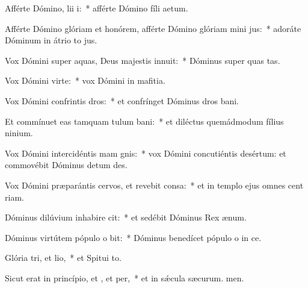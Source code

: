 \item Afférte Dómino, lii i:~* afférte Dómino fíli aetum.
\item Afférte Dómino glóriam et honórem, afférte Dómino glóriam mini jus:~* adoráte Dóminum in átrio to jus.
\item Vox Dómini super aquas, Deus majestis innuit:~* Dóminus super quas tas.
\item Vox Dómini  virte:~* vox Dómini in mafitia.
\item Vox Dómini confrintis dros:~* et confrínget Dóminus dros bani.
\item Et commínuet eas tamquam tulum bani:~* et diléctus quemádmodum fílius ninium.
\item Vox Dómini intercidéntis mam gnis:~* vox Dómini concutiéntis desértum: et commovébit Dóminus detum des.
\item Vox Dómini præparántis cervos, et revebit consa:~* et in templo ejus omnes cent riam.
\item Dóminus dilúvium inhabire cit:~* et sedébit Dóminus Rex  ænum.
\item Dóminus virtútem pópulo o bit:~* Dóminus benedícet pópulo o in ce.
\item Glória tri, et lio,~* et Spitui to.
\item Sicut erat in princípio, et , et per,~* et in sǽcula sæcurum. men.
